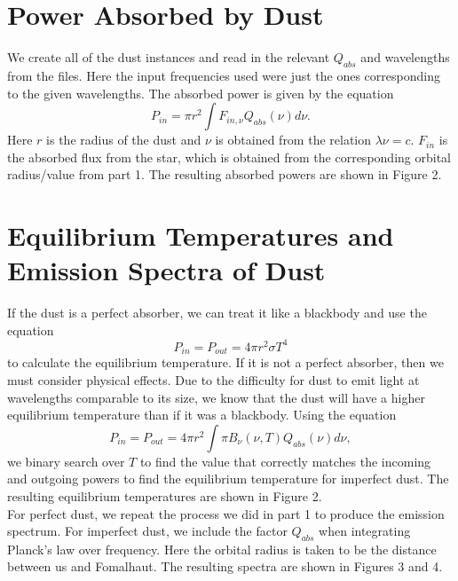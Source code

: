 \documentclass[12pt]{article}
\begin{document}
\section{Power Absorbed by Dust}

We create all of the dust instances and read in the relevant $Q_{abs}$ and wavelengths from the files. Here the input frequencies used were just the ones corresponding to the given wavelengths. The absorbed power is given by the equation $$P_{in} = \pi r^{2}\int F_{in,\nu}Q_{abs}(\nu)d\nu.$$ Here $r$ is the radius of the dust and $\nu$ is obtained from the relation $\lambda\nu = c$. $F_{in}$ is the absorbed flux from the star, which is obtained from the corresponding orbital radius/value from part 1. The resulting absorbed powers are shown in Figure 2.


\section{Equilibrium Temperatures and Emission Spectra of Dust}

If the dust is a perfect absorber, we can treat it like a blackbody and use the equation $$P_{in} = P_{out} = 4\pi{r}^{2}\sigma{T}^{4}$$ to calculate the equilibrium temperature. If it is not a perfect absorber, then we must consider physical effects. Due to the difficulty for dust to emit light at wavelengths comparable to its size, we know that the dust will have a higher equilibrium temperature than if it was a blackbody. Using the equation $$P_{in} = P_{out} = 4\pi{r}^{2}\int\pi B_{\nu}(\nu,T)Q_{abs}(\nu)d\nu,$$ we binary search over $T$ to find the value that correctly matches the incoming and outgoing powers to find the equilibrium temperature for imperfect dust. The resulting equilibrium temperatures are shown in Figure 2.\\
\indent For perfect dust, we repeat the process we did in part 1 to produce the emission spectrum. For imperfect dust, we include the factor $Q_{abs}$ when integrating Planck's law over frequency. Here the orbital radius is taken to be the distance between us and Fomalhaut. The resulting spectra are shown in Figures 3 and 4. 
\end{document}
